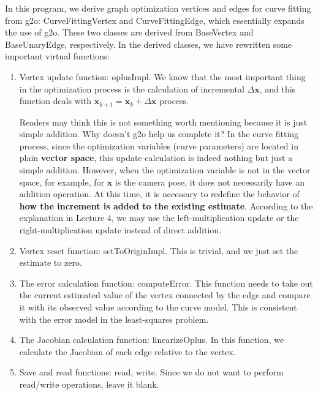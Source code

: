 In this program, we derive graph optimization vertices and edges for curve fitting from g2o: CurveFittingVertex and CurveFittingEdge, which essentially expands the use of g2o. These two classes are derived from BaseVertex and BaseUnaryEdge, respectively. In the derived classes, we have rewritten some important virtual functions:
\begin{enumerate}
    \item Vertex update function: oplusImpl. We know that the most important thing in the optimization process is the calculation of incremental $\Delta \mathbf{x}$, and this function deals with $\mathbf{x}_{k+1} = \mathbf{x}_k + \Delta \mathbf{x}$ process.

    Readers may think this is not something worth mentioning because it is just simple addition. Why doesn't g2o help us complete it? In the curve fitting process, since the optimization variables (curve parameters) are located in plain \textbf{vector space}, this update calculation is indeed nothing but just a simple addition. However, when the optimization variable is not in the vector space, for example, for $\mathbf{x}$ is the camera pose, it does not necessarily have an addition operation. At this time, it is necessary to redefine the behavior of \textbf{how the increment is added to the existing estimate}. According to the explanation in Lecture 4, we may use the left-multiplication update or the right-multiplication update instead of direct addition.

    \item Vertex reset function: setToOriginImpl. This is trivial, and we just set the estimate to zero.

    \item The error calculation function: computeError. This function needs to take out the current estimated value of the vertex connected by the edge and compare it with its observed value according to the curve model. This is consistent with the error model in the least-squares problem.
    
    \item The Jacobian calculation function: linearizeOplus. In this function, we calculate the Jacobian of each edge relative to the vertex.

    \item Save and read functions: read, write. Since we do not want to perform read/write operations, leave it blank.
\end{enumerate}

